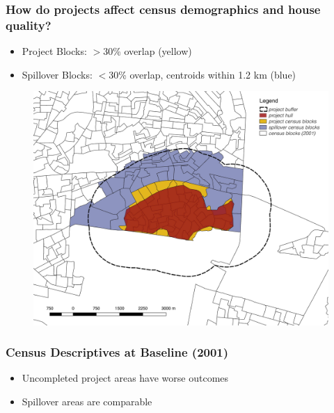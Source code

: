 \documentclass[aspectratio=149]{beamer}
\begin{document}
\begin{frame}
\frametitle{How do projects affect census demographics and house quality?}
\begin{itemize}
  \item Project Blocks: $>$30\% overlap (yellow)
  \item Spillover Blocks: $<$30\% overlap, centroids within 1.2 km (blue)
\end{itemize}
\begin{center}
\begin{figure}
\includegraphics[scale=0.27]{censusmap.jpg}
\vspace{-3mm}
\end{figure}
\end{center}
\end{frame}




\begin{frame}
\frametitle{Census Descriptives at Baseline (2001)}
\begin{itemize}
    \item Uncompleted project areas have worse outcomes
    \item Spillover areas are comparable
\end{itemize}
\vspace{.1cm}
\centering
\resizebox{\textwidth}{!}{  

}
\end{frame}
\end{document}
